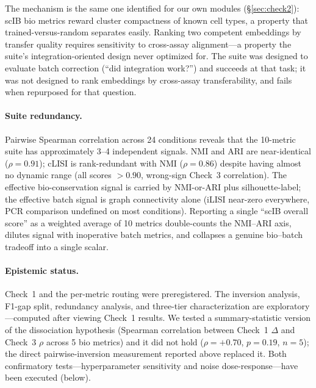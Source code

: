 \documentclass[10pt,letterpaper]{article}
\begin{document}
The mechanism is the same one identified for our own modules (\S\ref{sec:check2}): scIB bio metrics reward cluster compactness of known cell types, a property that trained-versus-random separates easily. Ranking two competent embeddings by transfer quality requires sensitivity to cross-assay alignment---a property the suite's integration-oriented design never optimized for. The suite was designed to evaluate batch correction (``did integration work?'') and succeeds at that task; it was not designed to rank embeddings by cross-assay transferability, and fails when repurposed for that question.

\paragraph{Suite redundancy.} Pairwise Spearman correlation across 24 conditions reveals that the 10-metric suite has approximately 3--4 independent signals. NMI and ARI are near-identical ($\rho = 0.91$); cLISI is rank-redundant with NMI ($\rho = 0.86$) despite having almost no dynamic range (all scores $> 0.90$, wrong-sign Check~3 correlation). The effective bio-conservation signal is carried by NMI-or-ARI plus silhouette-label; the effective batch signal is graph connectivity alone (iLISI near-zero everywhere, PCR comparison undefined on most conditions). Reporting a single ``scIB overall score'' as a weighted average of 10 metrics double-counts the NMI--ARI axis, dilutes signal with inoperative batch metrics, and collapses a genuine bio--batch tradeoff into a single scalar.

\paragraph{Epistemic status.} Check~1 and the per-metric routing were preregistered. The inversion analysis, F1-gap split, redundancy analysis, and three-tier characterization are exploratory---computed after viewing Check~1 results. We tested a summary-statistic version of the dissociation hypothesis (Spearman correlation between Check~1 $\Delta$ and Check~3 $\rho$ across 5 bio metrics) and it did not hold ($\rho = +0.70$, $p = 0.19$, $n = 5$); the direct pairwise-inversion measurement reported above replaced it. Both confirmatory tests---hyperparameter sensitivity and noise dose-response---have been executed (below).
\end{document}
